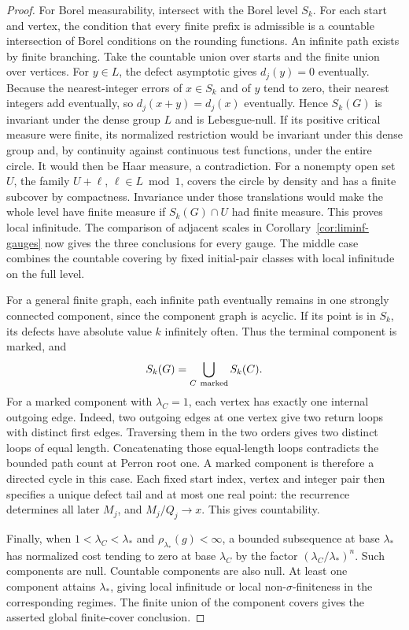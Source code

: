 \documentclass[11pt]{article}
\theoremstyle{definition}
\theoremstyle{remark}
\begin{document}
\begin{proof}
For Borel measurability, intersect with the Borel level $S_k$. For each
start and vertex, the condition that every finite prefix is admissible
is a countable intersection of Borel conditions on the rounding
functions. An infinite path exists by finite branching. Take the
countable union over starts and the finite union over vertices.
For $y\in L$, the defect asymptotic gives $d_j(y)=0$ eventually.
Because the nearest-integer errors of $x\in S_k$ and of $y$ tend to
zero, their nearest integers add eventually, so $d_j(x+y)=d_j(x)$
eventually. Hence $S_k(G)$ is invariant under the dense group $L$
and is Lebesgue-null. If its positive critical measure were finite,
its normalized restriction would be invariant under this dense group
and, by continuity against continuous test functions, under the
entire circle. It would then be Haar measure, a contradiction.
For a nonempty open set $U$, the family $U+\ell$, $\ell\in L\bmod 1$,
covers the circle by density and has a finite subcover by compactness.
Invariance under those translations would make the whole level have
finite measure if $S_k(G)\cap U$ had finite measure. This proves local
infinitude. The comparison of adjacent scales in
Corollary~\ref{cor:liminf-gauges} now gives the three conclusions for
every gauge. The middle case combines the countable covering by
fixed initial-pair classes with local infinitude on the full level.

For a general finite graph, each infinite path eventually remains
in one strongly connected component, since the component graph is
acyclic. If its point is in $S_k$, its defects have absolute value
$k$ infinitely often. Thus the terminal component is marked, and
\[
 S_k(G)=\bigcup_{C\ {\rm marked}} S_k(C).
\]
For a marked component with $\lambda_C=1$, each vertex has exactly
one internal outgoing edge. Indeed, two outgoing edges at one vertex
give two return loops with distinct first edges. Traversing them in
the two orders gives two distinct loops of equal length. Concatenating
those equal-length loops contradicts the bounded path count at
Perron root one. A marked component is therefore a directed cycle
in this case. Each fixed start index, vertex and integer pair
then specifies a unique defect tail and at most one real point:
the recurrence determines all later $M_j$, and $M_j/Q_j\to x$.
This gives countability.

Finally, when $1<\lambda_C<\lambda_*$ and
$\rho_{\lambda_*}(g)<\infty$, a bounded subsequence at base $\lambda_*$
has normalized cost tending to zero at base $\lambda_C$ by the
factor $(\lambda_C/\lambda_*)^n$. Such components are null.
Countable components are also null. At least one component attains
$\lambda_*$, giving local infinitude or local non-$\sigma$-finiteness
in the corresponding regimes. The finite union of the component
covers gives the asserted global finite-cover conclusion.
\end{proof}
\end{document}
